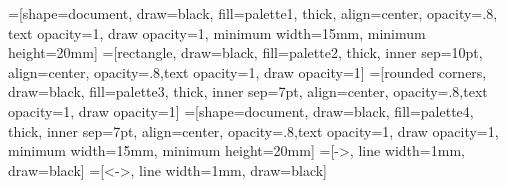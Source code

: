 \makeatletter

\makeatother

=[shape=document, draw=black, fill=palette1, thick, align=center, opacity=.8, text opacity=1, draw opacity=1, minimum width=15mm, minimum height=20mm]
=[rectangle, draw=black, fill=palette2, thick, inner sep=10pt, align=center, opacity=.8,text opacity=1, draw opacity=1]
=[rounded corners, draw=black, fill=palette3, thick, inner sep=7pt, align=center, opacity=.8,text opacity=1, draw opacity=1]
=[shape=document, draw=black, fill=palette4, thick, inner sep=7pt, align=center, opacity=.8,text opacity=1, draw opacity=1, minimum width=15mm, minimum height=20mm]
=[->, line width=1mm, draw=black]
=[<->, line width=1mm, draw=black]


